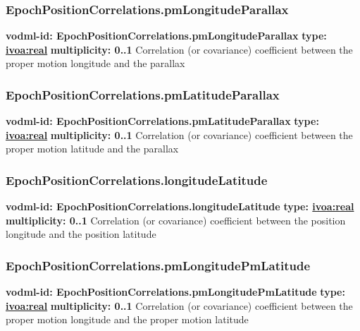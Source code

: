     \subsubsection{EpochPositionCorrelations.pmLongitudeParallax}
    \textbf{vodml-id: EpochPositionCorrelations.pmLongitudeParallax} \newline
    \textbf{type: \hyperref[sect:ivoa]{ivoa:real}} \newline
    \textbf{multiplicity: 0..1} \newline
    Correlation (or covariance) coefficient between the proper motion longitude and the parallax

    \subsubsection{EpochPositionCorrelations.pmLatitudeParallax}
    \textbf{vodml-id: EpochPositionCorrelations.pmLatitudeParallax} \newline
    \textbf{type: \hyperref[sect:ivoa]{ivoa:real}} \newline
    \textbf{multiplicity: 0..1} \newline
    Correlation (or covariance) coefficient between the proper motion latitude and the parallax

    \subsubsection{EpochPositionCorrelations.longitudeLatitude}
    \textbf{vodml-id: EpochPositionCorrelations.longitudeLatitude} \newline
    \textbf{type: \hyperref[sect:ivoa]{ivoa:real}} \newline
    \textbf{multiplicity: 0..1} \newline
    Correlation (or covariance) coefficient between the position longitude and the position latitude

    \subsubsection{EpochPositionCorrelations.pmLongitudePmLatitude}
    \textbf{vodml-id: EpochPositionCorrelations.pmLongitudePmLatitude} \newline
    \textbf{type: \hyperref[sect:ivoa]{ivoa:real}} \newline
    \textbf{multiplicity: 0..1} \newline
    Correlation (or covariance) coefficient between the proper motion longitude and the proper motion latitude

